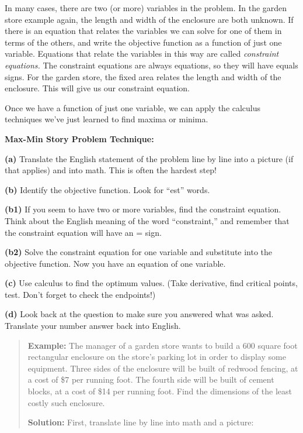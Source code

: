 In many cases, there are two (or more) variables in the problem. In the
garden store example again, the length and width of the enclosure are
both unknown. If there is an equation that relates the variables we can
solve for one of them in terms of the others, and write the objective
function as a function of just one variable. Equations that relate the
variables in this way are called \emph{constraint equations.} The
constraint equations are always equations, so they will have equals
signs. For the garden store, the fixed area relates the length and width
of the enclosure. This will give us our constraint equation.

Once we have a function of just one variable, we can apply the calculus
techniques we've just learned to find maxima or minima.

\textbf{Max-Min Story Problem Technique:}

\textbf{(a)} Translate the English statement of the problem line by line
into a picture (if that applies) and into math. This is often the
hardest step!

\textbf{(b)} Identify the objective function. Look for ``est'' words.

\textbf{(b1)} If you seem to have two or more variables, find the
constraint equation. Think about the English meaning of the word
``constraint,'' and remember that the constraint equation will have an =
sign.

\textbf{(b2)} Solve the constraint equation for one variable and
substitute into the objective function. Now you have an equation of one
variable.

\textbf{(c)} Use calculus to find the optimum values. (Take derivative,
find critical points, test. Don't forget to check the endpoints!)

\textbf{(d)} Look back at the question to make sure you answered what
was asked. Translate your number answer back into English.

\begin{quote}
\textbf{Example:} The manager of a garden store wants to build a 600
square foot rectangular enclosure on the store's parking lot in order to
display some equipment. Three sides of the enclosure will be built of
redwood fencing, at a cost of \$7 per running foot. The fourth side will
be built of cement blocks, at a cost of \$14 per running foot. Find the
dimensions of the least costly such enclosure.

\textbf{Solution:} First, translate line by line into math and a
picture:
\end{quote}

